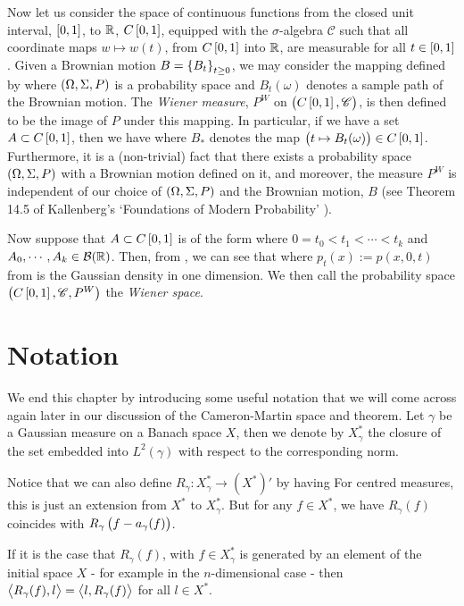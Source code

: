\documentclass[../main.tex]{subfiles}
\begin{document}
Now let us consider the space of continuous functions from the closed unit interval, $\intcc{0,1}$, to $\operatorname{\mathbb{R}}$, $C\intcc{0,1}$, equipped with the $\sigma$-algebra $\mathscr{C}$ such that all coordinate maps $w\mapsto w(t)$, from $C\intcc{0,1}$ into $\operatorname{\mathbb{R}}$, are measurable for all $t\in\intcc{0,1}$. Given a Brownian motion $B = \cbr{B_t}_{t\geq0}$, we may consider the mapping defined by  where $\del{\Omega,\Sigma,P}$ is a probability space and $B_t(\omega)$ denotes a sample path of the Brownian motion. The \emph{Wiener measure}, $P^W$ on $\del{C\intcc{0,1},\mathscr{C}}$, is then defined to be the image of $P$ under this mapping. In particular, if we have a set $A\subset C\intcc{0,1}$, then we have  where $B_*$ denotes the map $\del{t\mapsto B_t(\omega)}\in C\intcc{0,1}$. Furthermore, it is a (non-trivial) fact that there exists a probability space $\del{\Omega,\Sigma, P}$ with a Brownian motion defined on it, and moreover, the measure $P^W$ is independent of our choice of $\del{\Omega,\Sigma,P}$ and the Brownian motion, $B$ (see Theorem 14.5 of Kallenberg's `Foundations of Modern Probability' \cite{Kallenberg2021}).

Now suppose that $A\subset C\intcc{0,1}$ is of the form  where $0=t_0<t_1<\cdots<t_k$ and $A_0,\cdots,A_k\in\mathcal{B}(\operatorname{\mathbb{R}})$. Then, from , we can see that  where $p_t(x):= p(x,0,t)$ from  is the Gaussian density in one dimension. We then call the probability space $\del{C\intcc{0,1},\mathscr{C},P^W}$ the \emph{Wiener space}.

\section{Notation}
We end this chapter by introducing some useful notation that we will come across again later in our discussion of the Cameron-Martin space and theorem. Let $\gamma$ be a Gaussian measure on a Banach space $X$, then we denote by $X_\gamma^*$ the closure of the set  embedded into $L^2(\gamma)$ with respect to the corresponding norm.

Notice that we can also define $R_\gamma:X_\gamma^*\to (X^*)'$ by having  For centred measures, this is just an extension from $X^*$ to $X_\gamma^*$. But for any $f\in X^*$, we have $R_\gamma(f)$ coincides with $R_\gamma\left( f-a_\gamma(f) \right)$.

If it is the case that $R_\gamma(f)$, with $f\in X_\gamma^*$ is generated by an element of the initial space $X$ - for example in the $n$-dimensional case - then $\left\langle R_\gamma(f),l \right\rangle = \left\langle l,R_\gamma(f) \right\rangle$ for all $l\in X^*$.
\end{document}
